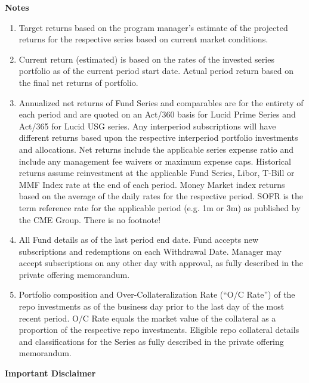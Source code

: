 \documentclass[9pt]{article}
\begin{document}
\onecolumn



\pagebreak 

\footnotesize
\noindent\textbf{\color{lucid_blue}Notes}

\begin{enumerate}
\item Target returns based on the program manager's estimate of the projected returns for the respective series based on current market conditions. 

\item Current return (estimated) is based on the rates of the invested series portfolio as of the current period start date.  Actual period return based on the final net returns of portfolio.   

\item Annualized net returns of Fund Series and comparables are for the entirety of each period and are quoted on an Act/360 basis for Lucid Prime Series and Act/365 for Lucid USG series. Any interperiod subscriptions will have different returns based upon the respective interperiod portfolio investments and allocations. Net returns include the applicable series expense ratio and include any management fee waivers or maximum expense caps. Historical returns assume reinvestment at the applicable Fund Series, Libor, T-Bill or MMF Index rate at the end of each period.  Money Market index returns based on the average of the daily rates for the respective period. SOFR is the term reference rate for the applicable period (e.g. 1m or 3m) as published by the CME Group. There is no footnote!

\item All Fund details as of the last period end date. Fund accepts new subscriptions and redemptions on each Withdrawal Date.  Manager may accept subscriptions on any other day with approval, as fully described in the private offering memorandum.

\item Portfolio composition and Over-Collateralization Rate (``O/C Rate'') of the repo investments as of the business day prior to the last day of the most recent period. O/C Rate equals the market value of the collateral as a proportion of the respective repo investments. Eligible repo collateral details and classifications for the Series as fully described in the private offering memorandum.

\end{enumerate}

\noindent\textbf{\color{lucid_blue}Important Disclaimer}
\end{document}
